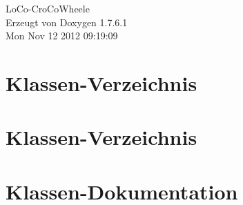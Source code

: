 \documentclass[a4paper]{book}
\begin{document}
\hypersetup{pageanchor=false,citecolor=blue}
\begin{titlepage}
\vspace*{7cm}
\begin{center}
{\Large \-Lo\-Co-\/\-Cro\-Co\-Wheele }\\
\vspace*{1cm}
{\large \-Erzeugt von Doxygen 1.7.6.1}\\
\vspace*{0.5cm}
{\small Mon Nov 12 2012 09:19:09}\\
\end{center}
\end{titlepage}
\clearemptydoublepage
{}
\tableofcontents
\clearemptydoublepage
{}
\hypersetup{pageanchor=true,citecolor=blue}
\chapter{\-Klassen-\/\-Verzeichnis}

\chapter{\-Klassen-\/\-Verzeichnis}

\chapter{\-Klassen-\/\-Dokumentation}















\printindex
\end{document}
